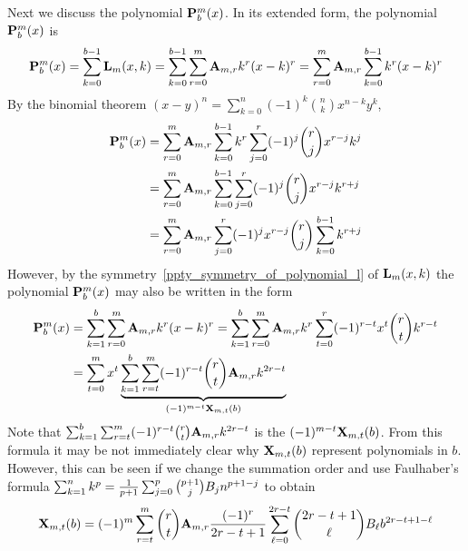 Next we discuss the polynomial ${\mathbf{P}}\sp{m} \sb{b}(x)$.
In its extended form, the polynomial ${\mathbf{P}}\sp{m} \sb{b}(x)$ is
\begin{equation*}
    \begin{split}
        {\mathbf{P}}\sp{m} \sb{b}(x) = \sum_{k=0}^{b-1} {\mathbf{L}}\sb{m}(x,k)
        =\sum_{k=0}^{b-1} \sum_{r=0}^{m} {\mathbf{A}} \sb{m,r} k^r(x-k)^r
        =\sum_{r=0}^{m} {\mathbf{A}} \sb{m,r} \sum_{k=0}^{b-1} k^r(x-k)^r
    \end{split}
\end{equation*}
By the binomial theorem $(x-y)^n = \sum_{k=0}^{n} (-1)^{k} \binom{n}{k} x^{n-k} y^{k}$,
\begin{equation*}
    \begin{split}
        {\mathbf{P}}\sp{m} \sb{b}(x)
        &=\sum_{r=0}^{m} {\mathbf{A}} \sb{m,r} \sum_{k=0}^{b-1} k^r \sum_{j=0}^{r} (-1)^{j} \binom{r}{j} x^{r-j} k^{j} \\
        &=\sum_{r=0}^{m} {\mathbf{A}} \sb{m,r} \sum_{k=0}^{b-1} \sum_{j=0}^{r} (-1)^{j} \binom{r}{j} x^{r-j} k^{r+j} \\
        &=\sum_{r=0}^{m} {\mathbf{A}} \sb{m,r} \sum_{j=0}^{r} (-1)^{j} x^{r-j} \binom{r}{j} \sum_{k=0}^{b-1} k^{r+j} \\
    \end{split}
\end{equation*}
However, by the symmetry~\eqref{ppty_symmetry_of_polynomial_l} of ${\mathbf{L}}\sb{m}(x,k)$ the polynomial
${\mathbf{P}}\sp{m} \sb{b}(x)$ may also be written in the form
\begin{equation*}
    \begin{split}
        {\mathbf{P}}\sp{m} \sb{b}(x)
        &=\sum_{k=1}^{b} \sum_{r=0}^{m} {\mathbf{A}} \sb{m,r} k^r(x-k)^r
        =\sum_{k=1}^{b} \sum_{r=0}^{m} {\mathbf{A}} \sb{m,r} k^r \sum_{t=0}^{r} (-1)^{r-t} x^t \binom{r}{t} k^{r-t} \\
        &=\sum_{t=0}^{m} x^t
        \underbrace{\sum_{k=1}^{b} \sum_{r=t}^{m} (-1)^{r-t} \binom{r}{t} {\mathbf{A}} \sb{m,r} k^{2r-t}}_{(-1)^{m-t} {\mathbf{X}}\sb{m,t} (b)}
    \end{split}
\end{equation*}
Note that
$\sum_{k=1}^{b} \sum_{r=t}^{m} (-1)^{r-t} \binom{r}{t} {\mathbf{A}} \sb{m,r} k^{2r-t}$
is the
$(-1)^{m-t} {\mathbf{X}}\sb{m,t} (b)$.
From this formula it may be not immediately clear why ${\mathbf{X}}\sb{m,t} (b)$ represent polynomials in $b$.
However, this can be seen if we change the summation order and use Faulhaber's formula
$\sum_{k=1}^{n} k^{p}=\frac{1}{p+1}\sum _{j=0}^{p} \binom{p+1}{j} {B}\sb{j} n^{p+1-j}$
to obtain
\begin{equation*}
    {\mathbf{X}}\sb{m,t} (b) = (-1)^m \sum_{r=t}^{m} \binom{r}{t} {\mathbf{A}} \sb{m,r} \frac{(-1)^r}{2r-t+1}
    \sum_{\ell=0}^{2r-t} \binom{2r-t+1}{\ell} {B}\sb{\ell} b^{2r-t+1-\ell}
\end{equation*}

